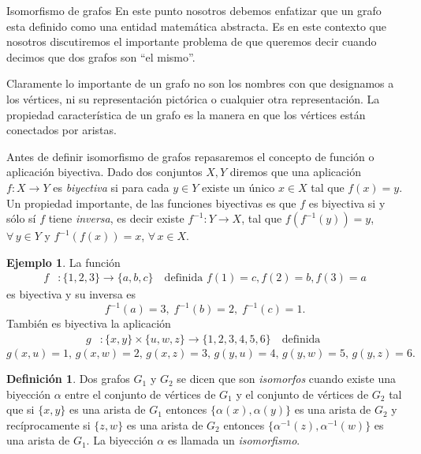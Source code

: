 \documentclass[11pt,spanish,makeidx]{amsbook}
\theoremstyle{definition}
\newtheorem{definicion}{Definici\'on}[section]
\newtheorem{ejemplo}{Ejemplo}[section]
\theoremstyle{remark}
\begin{document}
\begin{section}{Isomorfismo de grafos} \label{5.2}
En este punto nosotros debemos enfatizar que un grafo esta definido como una entidad matemática abstracta. Es en este contexto que nosotros discutiremos el importante problema de que queremos decir cuando decimos que dos grafos son ``el mismo''.

Claramente lo importante de un grafo no son los nombres con que designamos a los vértices, ni su representación pictórica o cualquier otra representación. La propiedad característica de un grafo es la manera en que los vértices están conectados por aristas. 

Antes de definir isomorfismo de grafos repasaremos el  concepto de función o aplicación biyectiva. Dado  dos conjuntos $X,Y$ diremos que una aplicación $f: X \to Y$ es {\em biyectiva} si para cada $y \in Y$ existe un  único $x \in X$ tal que $f(x) =y$. Un propiedad importante, de las funciones biyectivas es que $f$ es biyectiva si y sólo sí  $f$ tiene {\em inversa}, es decir existe $f^{-1}: Y \to X$, tal que $f(f^{-1}(y)) = y$, $\forall \,y \in Y$ y $f^{-1}(f(x)) = x$, $\forall \,x \in X$.

\begin{ejemplo}
La función  
\begin{align*}
f&: \{1,2,3\}\to\{a,b,c\} \quad \text{definida } f(1) = c, f(2) = b, f(3) = a
\end{align*}
es biyectiva y su  inversa es 
$$
f^{-1}(a) = 3,\;f^{-1}(b) = 2,\;f^{-1}(c) =1.
$$
También es biyectiva la aplicación
\begin{align*}
g&: \{x,y\}\times \{u,w,z\} \to \{1,2,3,4,5,6\} \quad \text{definida } 
\end{align*}
$$
g(x,u)= 1,\, g(x,w) =2,\, g(x,z) =3,\, g(y,u) =4,\, g(y,w) =5,\, g(y,z) =6. 
$$
\end{ejemplo}

\begin{definicion} Dos grafos $G_1$ y $G_2$ se dicen que son {\em isomorfos} cuando  existe una biyección $\alpha$ entre el     conjunto de vértices de $G_1$ y el conjunto de vértices de $G_2$ tal que  si $\{x,y\}$ es una arista de $G_1$ entonces $\{\alpha(x),\alpha(y)\}$ es una arista de $G_2$ y recíprocamente si  $\{z,w\}$ es una arista de $G_2$ entonces $\{\alpha^{-1}(z),\alpha^{-1}(w)\}$ es una arista de $G_1$. La biyección $\alpha$ es llamada un {\em isomorfismo}.
\end{definicion}


\end{section}
\end{document}

